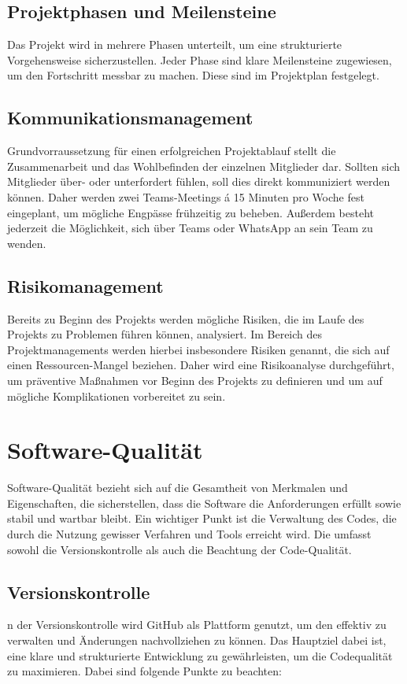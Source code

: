 \documentclass[a4paper,12pt]{article}
\begin{document}
\subsection{Projektphasen und Meilensteine} Das Projekt wird in mehrere Phasen unterteilt, um eine strukturierte Vorgehensweise sicherzustellen. Jeder Phase sind klare Meilensteine zugewiesen, um den Fortschritt messbar zu machen. Diese sind im Projektplan festgelegt.

\subsection{Kommunikationsmanagement} Grundvorraussetzung für einen erfolgreichen Projektablauf stellt die Zusammenarbeit und das Wohlbefinden der einzelnen Mitglieder dar. Sollten sich Mitglieder über- oder unterfordert fühlen, soll dies direkt kommuniziert werden können. Daher werden zwei Teams-Meetings á 15 Minuten pro Woche fest eingeplant, um mögliche Engpässe frühzeitig zu beheben. Außerdem besteht jederzeit die Möglichkeit, sich über Teams oder WhatsApp an sein Team zu wenden.

\subsection{Risikomanagement} Bereits zu Beginn des Projekts werden mögliche Risiken, die im Laufe des Projekts zu Problemen führen können, analysiert. Im Bereich des Projektmanagements werden hierbei insbesondere Risiken genannt, die sich auf einen Ressourcen-Mangel beziehen. Daher wird eine Risikoanalyse durchgeführt, um präventive Maßnahmen vor Beginn des Projekts zu definieren und um auf mögliche Komplikationen vorbereitet zu sein.

\newpage
\section{Software-Qualität}
Software-Qualität bezieht sich auf die Gesamtheit von Merkmalen und Eigenschaften, die sicherstellen, dass die Software die Anforderungen erfüllt sowie stabil und wartbar bleibt. Ein wichtiger Punkt ist die Verwaltung des Codes, die durch die Nutzung gewisser Verfahren und Tools erreicht wird. Die umfasst sowohl die Versionskontrolle als auch die Beachtung der Code-Qualität.

\subsection{Versionskontrolle}
n der Versionskontrolle wird GitHub als Plattform genutzt, um den effektiv zu verwalten und Änderungen nachvollziehen zu können. Das Hauptziel dabei ist, eine klare und strukturierte Entwicklung zu gewährleisten, um die Codequalität zu maximieren. Dabei sind folgende Punkte zu beachten:
\end{document}
